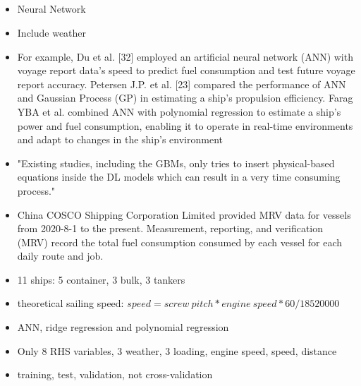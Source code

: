 \documentclass{article}
\newcommand{\paperpath}{../resources/}
\newcommand{\myhref}[2]{\href{run:\paperpath#1}{#2}}
\begin{document}
\subsection{\myhref{Wang et al 2023 - Ship Fuel and Carbon Emission Estimation Utilizing Artificial Neural Network and Data Fusion Techniques.pdf}{\textcite{wang2023ship}}}
\begin{itemize}
    \item Neural Network
    \item Include weather
    \item For example, Du et al. [32] employed an artificial neural network (ANN) with voyage report data’s speed to predict fuel consumption and test future voyage report accuracy. Petersen J.P. et al. [23] compared the performance of ANN and Gaussian Process (GP) in estimating a ship’s propulsion efficiency. Farag YBA et al. combined ANN with polynomial regression to estimate a ship’s power and fuel consumption, enabling it to operate in real-time environments and adapt to changes in the ship’s environment
    \item "Existing studies, including the GBMs, only tries to insert physical-based equations inside the DL models which can result in a very time consuming process."
    \item China COSCO Shipping Corporation Limited provided MRV data for vessels from 2020-8-1 to the present. Measurement, reporting, and verification (MRV) record the total fuel consumption consumed by each vessel for each daily route and job.
    \item 11 ships: 5 container, 3 bulk, 3 tankers
    \item theoretical sailing speed: $speed =screw~pitch*engine~speed*60/18520000$
    \item ANN, ridge regression and polynomial regression
    \item Only 8 RHS variables, 3 weather, 3 loading, engine speed, speed, distance
    \item training, test, validation, not cross-validation
\end{itemize}
\end{document}
